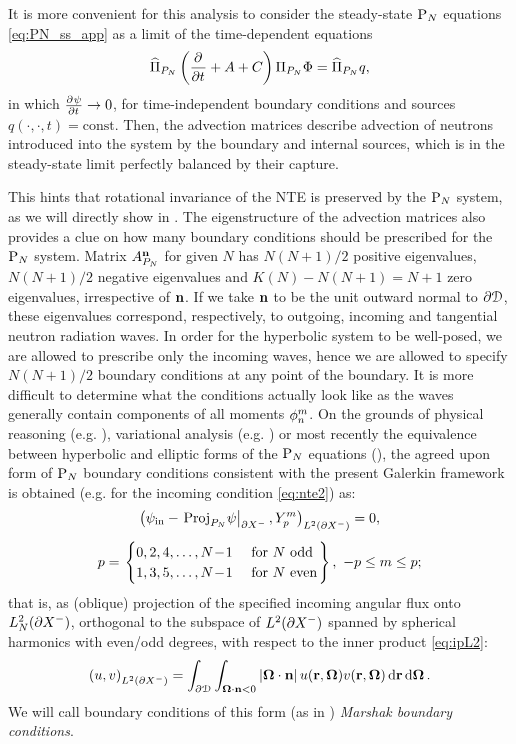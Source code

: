 It is more convenient for this analysis to consider the steady-state $\PN$ equations \eqref{eq:PN_ss_app} as a limit of the 
time-dependent equations
\begin{equation}\label{eq:PN_ss_app}
	\PihPN \left(\pd{}{t} + A + C\right) \PiPN\Phi = \PihPN q,
\end{equation}
in which $\pd{\psi}{t} \to 0$, for time-independent boundary conditions and sources
\linebreak[4]\mbox{$q(\cdot,\cdot,t) = \text{const}$}.
Then, the advection matrices describe advection of neutrons introduced into the system by the boundary and internal
sources, which is in the steady-state limit perfectly balanced by their capture.

This hints that rotational invariance of the NTE is preserved by the $\PN$ system, as we will directly show in 
. The eigenstructure of the advection matrices also provides a clue on how many boundary conditions
should be prescribed for the $\PN$ system. Matrix $A_{P_N}^{\bn}$ for given $N$ has
$N(N+1)/2$ positive eigenvalues, $N(N+1)/2$ negative eigenvalues and $K(N) - N(N+1) = N+1$ zero eigenvalues,
irrespective of $\bn$. If we take $\bn$ to be the unit outward normal to $\pV$, these eigenvalues correspond,
respectively, to outgoing, incoming and tangential neutron radiation waves. In order for the hyperbolic system to be
well-posed, we are allowed to prescribe only the incoming waves, hence we are allowed to specify $N(N+1)/2$ boundary
conditions at any point of the boundary. It is more difficult to determine what the conditions actually look like as the
waves generally contain components of all moments $\angmom{n}{m}$. On the grounds of physical reasoning
(e.g. \cite{Rumyantsev}), variational analysis (e.g. \cite{Davis}) or most recently the equivalence between hyperbolic
and elliptic forms of the $\PN$ equations (\cite{Sanchez8}), the agreed upon form of $\PN$ boundary conditions
consistent with the present Galerkin framework is obtained (e.g. for the incoming condition \eqref{eq:nte2}) as:
$$
\begin{gathered}
	\left(\psi_\text{in} - \left.\Projop[P_N]\!\psi\right\vert_{\pX[-]}, \Y{p}{m} \right)_{\Lp[2](\pX[-])} = 0,\\[.35em] 
	p = 
	\left.\begin{cases}
		0,2,4,\ldots,N\!-\!1 & \mbox{ for $N$ odd}\\
		1,3,5,\ldots,N\!-\!1 & \mbox{ for $N$ even}	
	\end{cases}\right\},\ -p \leq m \leq p;
\end{gathered}
$$
that is, as (oblique) projection of the specified incoming angular flux onto $\Lp[2]_N(\pX[-])$, orthogonal
to the subspace of $\Lp[2](\pX[-])$ spanned by spherical harmonics with even/odd degrees, with respect to the inner
product \eqref{eq:ipL2}:
$$
	\left(u,v\right)_{\Lp[2](\pX[-])} = \int_{\pV}\int_{\bomega\cdot\bn < 0}\abs{\bomega\cdot\bn}
	u(\br,\bomega)v(\br,\bomega)\,\d{\br}\d{\bomega}.
$$
We will call boundary conditions of this form (as in \cite{Davis}) \textit{Marshak boundary conditions}.

